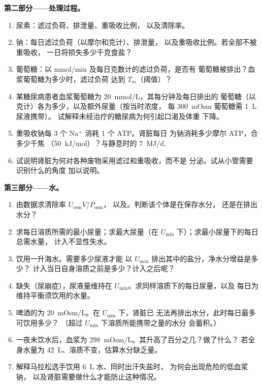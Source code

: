 \begin{problem}
\medskip
\noindent\textbf{第二部分——处理过程。}
\begin{enumerate}[resume]
  \item 尿素：滤过负荷、排泄量、重吸收比例，
        以及清除率。
  \item 钠：每日滤过负荷（以摩尔和克计）、排泄量，
        以及重吸收比例。若全部不被重吸收，
        一日将损失多少千克食盐？
  \item 葡萄糖：以 mmol/min 及每日克数计的滤过负荷，是否有
        葡萄糖被排出？血浆葡萄糖为多少时，滤过负荷
        达到 $T_{m}$（阈值）？
  \item 某糖尿病患者血浆葡萄糖为 \qty{20}{mmol/L}，其每分钟及每日排出的
        葡萄糖（以克计）各为多少，以及额外尿量（按当时浓度，
        每 \qty{300}{mOsm} 葡萄糖需 \qty{1}{L} 尿液携带）。
        试解释未经治疗的糖尿病为何引起口渴及体重
        下降。
  \item 重吸收钠每 3 个 Na$^{+}$ 消耗 1 个 ATP。肾脏每日
        为钠消耗多少摩尔 ATP，合多少千焦
        （\qty{50}{kJ/mol}）？与静息时的
        \qty{7}{MJ/d}.
  \item 试说明肾脏为何对各种废物采用滤过和重吸收，而不是
        分泌。试从小管需要识别什么的角度
        加以说明。
\end{enumerate}

\medskip
\noindent\textbf{第三部分——水。}
\begin{enumerate}[resume]
  \item 由数据求清除率 $U_{\text{osm}}V/P_{\text{osm}}$，
        以及。判断该个体是在保存水分，
        还是在排出水分？
  \item 求每日溶质所需的最小尿量；求最大尿量（在
        $U_{\min}$ 下）；求最小尿量下的每日总需水量，
        计入不显性失水。
  \item 饮用一升海水。需要多少尿液才能
        以 $U_{\max}$ 排出其中的盐分，净水分增益是多少？
        计入当日自身溶质之前是多少？计入之后呢？
  \item {}缺失（尿崩症），尿液量维持在
        $U_{\min}$。求同样溶质下的每日尿量，以及
        每日为维持平衡须饮用的水量。
  \item 啤酒的为 \qty{20}{mOsm/L}。在 $U_{\min}$ 下，肾脏已
        无法再排出水分，此时每日最多可饮用多少？
        （超过 $U_{\min}$ 下溶质所能携带之量的水分
        会蓄积。）
  \item 一夜未饮水后，血浆为
        \qty{298}{mOsm/L}。其升高了百分之几？做了什么？
        若全身水量为
        \qty{42}{L}、溶质不变，估算水分缺乏量。
  \item 解释马拉松选手饮用 \qty{6}{L} 水、同时出汗失盐时，
        为何会出现危险的低血浆钠，
        以及肾脏需要做什么才能防止这种情况。
\end{enumerate}


\end{problem}
